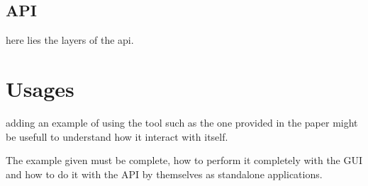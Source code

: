 

\subsection{API}
here lies the layers of the api.

\section{Usages}\label{sec:theo-subgraph}
adding an example of using the tool such as the one provided in the paper might be usefull to understand how it interact with itself.

The example given must be complete, how to perform it completely with the GUI and how to do it with the API by themselves as standalone applications.


